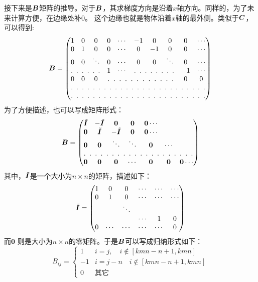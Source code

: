 接下来是$\bm{B}$矩阵的推导。对于$\bm{B}$，其求梯度方向是沿着$x$轴方向。同样的，为了未来计算方便，在边缘处补$0$。
这个边缘也就是物体沿着$x$轴的最外侧。类似于$\bm{C}$，可以得到:
\begin{equation*}
\B = \begin{pmatrix}
1 & 0 & 0 & 0 & \cdots &-1 & 0 &0 &0 &\cdots \\
0 & 1 & 0 & 0 &\cdots &0 & -1 &0 &0 &\cdots \\
0 & 0 & \ddots & 0 & \cdots & 0 & 0 & \ddots & 0& \cdots \\
\hdotsfor[3]{3}& 1& \cdots &\hdotsfor[3]{3}&-1&\cdots \\
0 & 0 & 0 & \hdotsfor[3]{5}&0&0 \\
\hdotsfor[3]{10}\\
\hdotsfor[3]{10}
\end{pmatrix}
\end{equation*}
为了方便描述，也可以写成矩阵形式：
\begin{equation*}
\B = \begin{pmatrix}
\tilde{\bI} &  -\tilde{\bI} & \0 & \0 & \0 \cdots \\
\0 & \tilde{\bI} &  -\tilde{\bI} & \0 & \0 \cdots \\
\0 & \0  & \ddots & \ddots & \0 & \cdots \\
\hdotsfor[3]{7} \\
\0 & \0 & \0 &\cdots & \0 & \0 &\0 \cdots
\end{pmatrix}
\end{equation*}
其中，$\tilde{\bm{I}}$是一个大小为$n \times n$的矩阵，描述如下：
\begin{equation*}
\tilde{\bm{I}} = \begin{pmatrix}
1 & 0 & 0 & \cdots &\cdots & \cdots\\
0 & 1 & 0 & \cdots &\cdots & \cdots\\
 & &\ddots & \\
& & & \cdots& 1 & 0 \\
0 & \cdots & \cdots & \cdots & \cdots & 0
\end{pmatrix}
\end{equation*}
而$\bm 0$ 则是大小为$n \times n$的零矩阵。于是$\bm{B}$可以写成归纳形式如下：
\begin{equation}\label{eq:B}
B_{ij} = \begin{cases}
1 & i=j, \quad i \notin [kmn-n+1,kmn] \\
-1 & i = j-n \quad i \notin [kmn-n+1,kmn] \\
0 & \text{其它}
\end{cases}
\end{equation}

